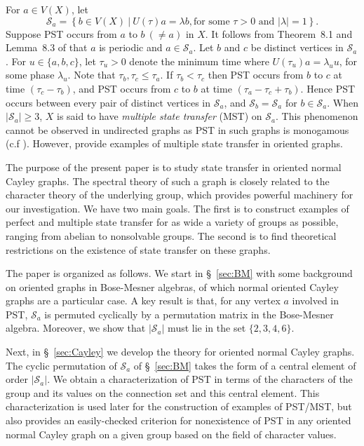 \documentclass{amsart}
\theoremstyle{plain}
\theoremstyle{remark}\newtheorem{con}[theorem]{Construction}
\theoremstyle{remark} \newtheorem*{remark}{Remark}
\theoremstyle{remark} \newtheorem{example}{Example}
\newcommand{\cS}{\mathcal{S}}
\newcommand{\abs}[1]{|#1|}
\begin{document}
For $a\in V(X)$, let
\begin{equation*}
    \cS_a = \left\{ b \in V(X) \ \vert \ U(\tau)a = \lambda b, \text{for some $\tau > 0$ and $\vert\lambda\vert=1$}\right\}.
\end{equation*}
Suppose PST occurs from $a$ to $b\ (\neq a)$ in $X$.
It follows from Theorem~8.1 and Lemma~8.3 of \cite{GodsilRST} that $a$ is periodic and $a\in \cS_a$.  Let $b$ and $c$ be distinct vertices in $\cS_a$.  For $u\in \{a,b,c\}$, let $\tau_u>0$ denote the minimum time where $U(\tau_u)a = \lambda_u u$, for some phase $\lambda_u$. 
Note that $\tau_b, \tau_c \leq \tau_a$.
If $\tau_b < \tau_c$ then PST occurs from $b$ to $c$ at time $(\tau_c-\tau_b)$,
and PST occurs from $c$ to $b$ at time $(\tau_a-\tau_c+\tau_b)$.  
Hence PST occurs between every pair of distinct vertices in $\cS_a$, and $\cS_b=\cS_a$ for $b\in \cS_a$.  
When $\vert \cS_a\vert \geq 3$, $X$ is said to have {\it multiple state transfer} (MST) on $\cS_a$. This phenomenon cannot be observed in undirected graphs as PST in such graphs is monogamous (c.f \cite{kay}). However, \cite{cameron2014universal, godsil2020perfect, acuaviva2023state, godsil2024oriented} provide examples of multiple state transfer in oriented graphs. 

The purpose of the present paper is to study state transfer in oriented normal Cayley graphs. The spectral
theory of such a graph is closely related to
the character theory of the underlying group,
which provides powerful machinery for our investigation.
We have two main goals. The first is  to construct examples of perfect and multiple state transfer for as wide a variety of groups as possible, ranging from  abelian to nonsolvable groups. The second is to find theoretical restrictions on the existence of state transfer on these graphs.

The paper is organized as follows. 
We start in \S~\ref{sec:BM} with some background on oriented graphs in Bose-Mesner algebras, of which
normal oriented Cayley graphs are a particular case.
A key result is that, for any vertex $a$ involved in PST, $\cS_a$ is permuted cyclically by a permutation matrix in the Bose-Mesner algebra.  Moreover, 
we show that $\abs{\cS_a}$ must lie in the set $\{2,3,4,6\}$.

Next, in \S~\ref{sec:Cayley} we develop the theory for oriented normal Cayley graphs.  The cyclic permutation of $\cS_a$ of \S~\ref{sec:BM} takes the form of a
central element of order $\abs{\cS_a}$. We obtain a characterization of PST in terms of the characters of the group and its values on the connection set and this central element. This characterization is used later for the construction of examples of PST/MST, but also provides an easily-checked criterion for nonexistence of PST in any oriented normal Cayley graph on a given group based on the field of character values.
\end{document}
